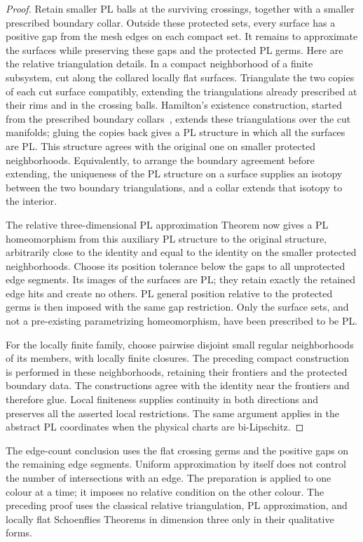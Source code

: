 \begin{proof}
Retain smaller PL balls at the surviving crossings, together with a
smaller prescribed boundary collar.  Outside these protected sets,
every surface has a positive gap from the mesh edges on each compact
set.  It remains to approximate the surfaces while preserving these
gaps and the protected PL germs.  Here are the relative triangulation
details.  In a compact neighborhood of a finite subsystem, cut along
the collared locally flat surfaces.  Triangulate the two copies of
each cut surface compatibly, extending the triangulations already
prescribed at their rims and in the crossing balls.  Hamilton's existence construction, started from the prescribed
boundary collars~\cite[Theorem~2.1 and Section~3, p.~69]{Hamilton1976},
extends these triangulations over the cut manifolds; gluing the copies back gives a PL structure in
which all the surfaces are PL.  This structure agrees with the original
one on smaller protected neighborhoods.  Equivalently, to arrange the
boundary agreement before extending, the uniqueness of the PL structure
on a surface supplies an isotopy between the two boundary
triangulations, and a collar extends that isotopy to the interior.

The relative three-dimensional PL approximation Theorem
\cite[Section~3, Theorem~2.2]{Hamilton1976} now gives a
PL homeomorphism from this auxiliary PL structure to the original
structure, arbitrarily close to the identity and equal to the identity
on the smaller protected neighborhoods.  Choose its position tolerance
below the gaps to all unprotected edge segments.  Its images of the
surfaces are PL; they retain exactly the retained edge hits and create
no others.  PL general position relative to the protected germs is
then imposed with the same gap restriction.  Only the surface sets,
and not a pre-existing parametrizing homeomorphism, have been
prescribed to be PL.

For the locally finite family, choose pairwise disjoint small regular
neighborhoods of its members, with locally finite closures.  The
preceding compact construction is performed in these neighborhoods,
retaining their frontiers and the protected boundary data.  The
constructions agree with the identity near the frontiers and therefore
glue.  Local finiteness supplies continuity in both directions and
preserves all the asserted local restrictions.  The same argument
applies in the abstract PL coordinates when the physical charts are
bi-Lipschitz.
\end{proof}

\begin{remark}
The edge-count conclusion uses the flat crossing germs and the positive
gaps on the remaining edge segments.  Uniform approximation by itself
does not control the number of intersections with an edge.  The
preparation is applied to one colour at a time; it imposes no relative
condition on the other colour.  The preceding proof uses the classical
relative triangulation, PL approximation, and locally flat
Schoenflies Theorems in dimension three only in their qualitative
forms.
\end{remark}

